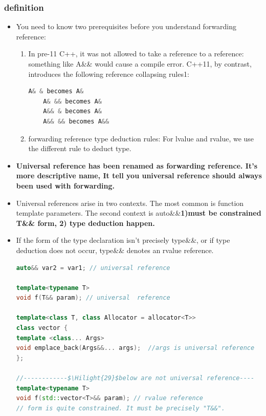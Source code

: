 \documentclass[a4paper,12pt,twoside]{book}
\newcommand{\Hilight}[1]{\makebox[0pt][l]{\color{yellow}\rule[-3pt]{#1em}{11pt}}}
\begin{document}
\subsubsection{definition}
\begin{itemize}
\item You need to know two prerequisites before you understand forwarding reference:

\begin{enumerate}
	\item In pre-11 C++, it was not allowed to take a reference to a reference: something like A\&\& would cause a compile error. C++11, by contrast, introduces the following reference collapsing rules1:
	
	\begin{lstlisting}[frame=single, language=c++]
	A& & becomes A&
	A& && becomes A&
	A&& & becomes A&
	A&& && becomes A&&
	\end{lstlisting}
	
	\item forwarding reference type deduction rules: For lvalue and rvalue, we use the different rule to deduct type.
\end{enumerate}

\item \textbf{Universal reference has been renamed as forwarding reference. It's more descriptive name, It tell you universal reference should always been used with forwarding.}

\item  Universal references arise in two contexts. The most common is function template parameters. The second context is auto\&\&\textbf{1)must be constrained T\&\& form, 2) type deduction happen.}

\item If the form of the type declaration isn't precisely type\&\&, or if type deduction does not occur, type\&\& denotes an rvalue reference.
\begin{lstlisting}[frame=single, language=c++, mathescape=true]
auto&& var2 = var1; // universal reference

template<typename T>
void f(T&& param); // universal  reference

template<class T, class Allocator = allocator<T>>
class vector {
template <class... Args>
void emplace_back(Args&&... args);  //args is universal reference
};

//------------$\Hilight{29}$below are not universal reference----
template<typename T>
void f(std::vector<T>&& param); // rvalue reference
// form is quite constrained. It must be precisely "T&&".


\end{lstlisting}
\end{itemize}
\end{document}
